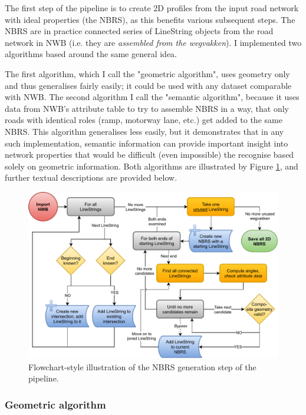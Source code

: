 The first step of the pipeline is to create 2D profiles from the input road network with ideal properties (the NBRS), as this benefits various subsequent steps. The NBRS are in practice connected series of LineString objects from the road network in NWB (i.e. they are \textit{assembled from the wegvakken}). I implemented two algorithms based around the same general idea.

The first algorithm, which I call the "geometric algorithm", uses geometry only and thus generalises fairly easily; it could be used with any dataset comparable with NWB. The second algorithm I call the "semantic algorithm", because it uses data from NWB's attribute table to try to assemble NBRS in a way, that only roads with identical roles (ramp, motorway lane, etc.) get added to the same NBRS. This algorithm generalises less easily, but it demonstrates that in any such implementation, semantic information can provide important insight into network properties that would be difficult (even impossible) the recognise based solely on geometric information. Both algorithms are illustrated by Figure \ref{fig:nbrsgenerationflow}, and further textual descriptions are provided below.

\begin{figure}
    \centering
    \includegraphics[width=0.9\linewidth]{final_report/figs/nbrs_generation.pdf}
    \caption{Flowchart-style illustration of the NBRS generation step of the pipeline.}
    \label{fig:nbrsgenerationflow}
\end{figure}

\subsubsection{Geometric algorithm}

